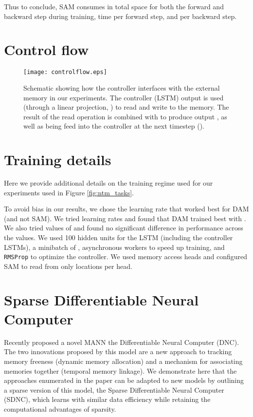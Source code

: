 \documentclass{article}
\begin{document}
Thus to conclude, SAM consumes in total  space for both the forward and backward step during training,  time per forward step, and  per backward step.

\section{Control flow}

\begin{figure}[H]
    \centering
    \texttt{[image: controlflow.eps]}
    \caption{Schematic showing how the controller interfaces with the external memory in our experiments. The controller (LSTM) output  is used (through a linear projection, ) to read and write to the memory. The result of the read operation  is combined with  to produce output , as well as being feed into the controller at the next timestep ().}
    \label{fig:controlflow}
\end{figure}

\section{Training details}
\label{sec:training_details}
Here we provide additional details on the training regime used for our experiments used in Figure \ref{fig:ntm_tasks}.

To avoid bias in our results, we chose the learning rate that worked best for DAM (and not SAM). We tried learning rates  and found that DAM trained best with . We also tried values of   and found no significant difference in performance across the values.  We used 100 hidden units for the LSTM (including the controller LSTMs), a minibatch of ,  asynchronous workers to speed up training, and \texttt{RMSProp} \cite{tieleman2012lecture} to optimize the controller. We used  memory access heads and configured SAM to read from only  locations per head.


\section{Sparse Differentiable Neural Computer}
\label{sec:sdnc}

Recently \cite{graves2016dnc} proposed a novel MANN the Differentiable Neural Computer (DNC). The two innovations proposed by this model are a new approach to tracking memory freeness (dynamic memory allocation) and a mechanism for associating memories together (temporal memory linkage).
We demonstrate here that the approaches enumerated in the paper can be adapted to new models by outlining a sparse version of this model, the Sparse Differentiable Neural Computer (SDNC), which learns with similar data efficiency while retaining the computational advantages of sparsity.
\end{document}
